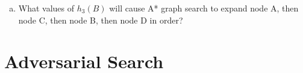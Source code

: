 \documentclass[a4paper]{article}
\begin{document}
\begin{enumerate}[(a)]
\newpage

\vspace{4em}
\item What values of $h_3(B)$ will cause A* graph search to expand node A, then node C, then node B, then node D in order?

\vspace{10em}

\end{enumerate}

\section{Adversarial Search}
\end{document}
